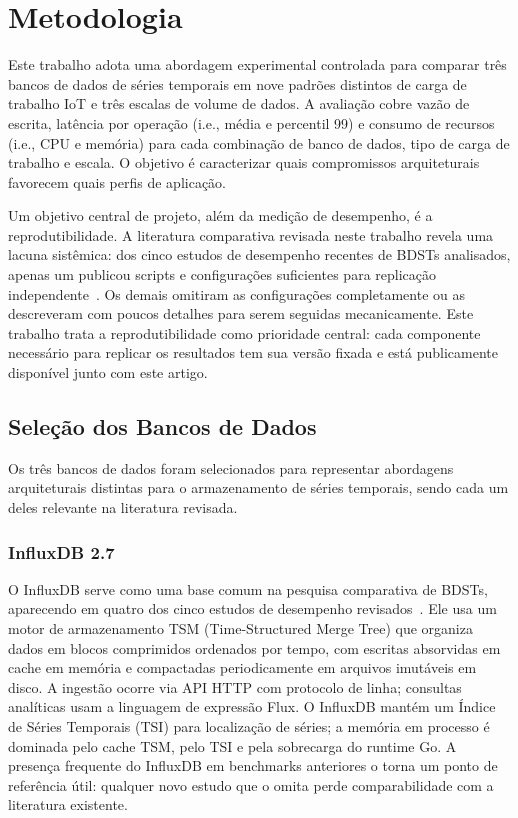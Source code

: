 \section{Metodologia}
\label{sec:methodology}

Este trabalho adota uma abordagem experimental controlada para comparar três bancos de dados de
séries temporais em nove padrões distintos de carga de trabalho IoT e três escalas de volume de
dados. A avaliação cobre vazão de escrita, latência por operação (i.e., média e percentil 99) e consumo
de recursos (i.e., CPU e memória) para cada combinação de banco de dados, tipo de carga de trabalho e
escala. O objetivo é caracterizar quais compromissos arquiteturais favorecem quais perfis de
aplicação.

Um objetivo central de projeto, além da medição de desempenho, é a reprodutibilidade.
A literatura comparativa revisada neste trabalho revela uma lacuna sistêmica: dos cinco estudos
de desempenho recentes de BDSTs analisados, apenas um publicou scripts e configurações
suficientes para replicação independente~\citep{pereira2023mulletbench}. Os demais omitiram as configurações completamente ou as descreveram com poucos detalhes para serem seguidas mecanicamente.
Este trabalho trata a reprodutibilidade como prioridade central: cada componente necessário para replicar os resultados tem sua versão fixada e está publicamente disponível junto com este artigo.

\subsection{Seleção dos Bancos de Dados}

Os três bancos de dados foram selecionados para representar abordagens arquiteturais distintas para o armazenamento de séries temporais, sendo cada um deles relevante na literatura revisada.

\subsubsection{InfluxDB 2.7}

O InfluxDB serve como uma base comum na pesquisa comparativa de BDSTs, aparecendo em quatro dos cinco estudos de desempenho revisados~\citep{naqvi2017influxdb,
shah2022performance,lima2024avaliando,wang2023iotdb}. Ele usa um motor de armazenamento TSM
(Time-Structured Merge Tree) que organiza dados em blocos comprimidos ordenados por tempo,
com escritas absorvidas em cache em memória e compactadas periodicamente em arquivos imutáveis
em disco. A ingestão ocorre via API HTTP com protocolo de linha; consultas analíticas usam a
linguagem de expressão Flux. O InfluxDB mantém um Índice de Séries Temporais (TSI) para
localização de séries; a memória em processo é dominada pelo cache TSM, pelo TSI e pela
sobrecarga do runtime Go. A presença frequente do InfluxDB em benchmarks anteriores o torna um
ponto de referência útil: qualquer novo estudo que o omita perde comparabilidade com a
literatura existente.

